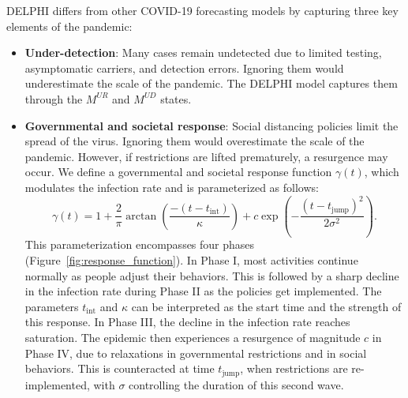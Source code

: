 \documentclass[msom,blindrev]{informs3} %
\begin{document}
DELPHI differs from other COVID-19 forecasting models  by capturing three key elements of the pandemic: 
\begin{itemize}
    \item \textbf{Under-detection}: Many cases remain undetected due to limited testing, asymptomatic carriers, and detection errors. Ignoring them would underestimate the scale of the pandemic. The DELPHI model captures them through the $M^{UR}$ and $M^{UD}$ states.
    \item \textbf{Governmental and societal response}: Social distancing policies limit the spread of the virus. Ignoring them would overestimate the scale of the pandemic. However, if restrictions are lifted prematurely, a resurgence may occur. We define a governmental and societal response function $\gamma(t)$, which modulates the infection rate and is parameterized as follows: 
    \begin{equation}
        \gamma(t)=1 + \frac{2}{\pi}\arctan\left(\frac{-(t-t_\text{int})}{\kappa}\right) + c\exp\left(-\frac{(t-t_\text{jump})^2}{2\sigma^2}\right). \label{eq:gamma}
    \end{equation}
    This parameterization encompasses four phases (Figure~\ref{fig:response_function}). In Phase I, most activities continue normally as people adjust their behaviors. This is followed by a sharp decline in the infection rate during Phase II as the policies get implemented. The parameters $t_{\text{int}}$ and $\kappa$ can be interpreted as the start time and the strength of this response. In Phase III, the decline in the infection rate reaches saturation. The epidemic then experiences a resurgence of magnitude $c$ in Phase IV, due to relaxations in governmental restrictions and in social behaviors. This is counteracted at time $t_{\text{jump}}$, when restrictions are re-implemented, with $\sigma$ controlling the duration of this second wave.
\begin{figure}[ht!]
    \centering
\end{figure}
\end{itemize}
\end{document}
